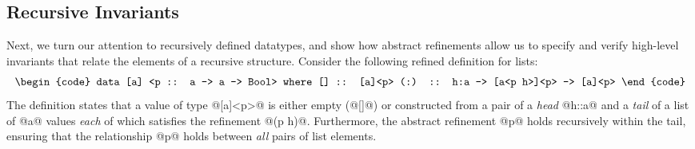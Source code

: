 {{\subsection{Recursive Invariants}\label{sec:overview:rec}

Next, we turn our attention to recursively defined datatypes, and show 
how abstract refinements allow us to specify and verify high-level
invariants that relate the elements of a recursive structure.
Consider the following refined definition for lists:
%
$$\centering\begin{tabular}{c}\begin{code}
data [a] <p :: a -> a -> Bool> where
  []  :: [a]<p>
  (:) :: h:a -> [a<p h>]<p> -> [a]<p>
\end{code}\end{tabular}$$
%
%
The definition states that a value of type @[a]<p>@ 
is either empty (@[]@) or constructed from a pair of  
a \emph{head} @h::a@ and a \emph{tail} of a list of 
@a@ values \emph{each} of which satisfies the refinement @(p h)@. 
Furthermore, the abstract refinement @p@ holds recursively
within the tail, ensuring that the relationship @p@ 
holds between \emph{all} pairs of list elements.

}}
